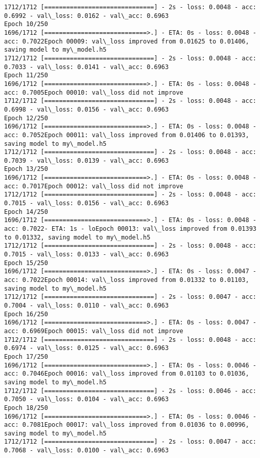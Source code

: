 \documentclass[11pt]{article}
\begin{document}
\begin{Verbatim}[commandchars=\\\{\}]
1712/1712 [==============================] - 2s - loss: 0.0048 - acc: 0.6992 - val\_loss: 0.0162 - val\_acc: 0.6963
Epoch 10/250
1696/1712 [============================>.] - ETA: 0s - loss: 0.0048 - acc: 0.7022Epoch 00009: val\_loss improved from 0.01625 to 0.01406, saving model to my\_model.h5
1712/1712 [==============================] - 2s - loss: 0.0048 - acc: 0.7033 - val\_loss: 0.0141 - val\_acc: 0.6963
Epoch 11/250
1696/1712 [============================>.] - ETA: 0s - loss: 0.0048 - acc: 0.7005Epoch 00010: val\_loss did not improve
1712/1712 [==============================] - 2s - loss: 0.0048 - acc: 0.6998 - val\_loss: 0.0156 - val\_acc: 0.6963
Epoch 12/250
1696/1712 [============================>.] - ETA: 0s - loss: 0.0048 - acc: 0.7052Epoch 00011: val\_loss improved from 0.01406 to 0.01393, saving model to my\_model.h5
1712/1712 [==============================] - 2s - loss: 0.0048 - acc: 0.7039 - val\_loss: 0.0139 - val\_acc: 0.6963
Epoch 13/250
1696/1712 [============================>.] - ETA: 0s - loss: 0.0048 - acc: 0.7017Epoch 00012: val\_loss did not improve
1712/1712 [==============================] - 2s - loss: 0.0048 - acc: 0.7015 - val\_loss: 0.0156 - val\_acc: 0.6963
Epoch 14/250
1696/1712 [============================>.] - ETA: 0s - loss: 0.0048 - acc: 0.7022- ETA: 1s - loEpoch 00013: val\_loss improved from 0.01393 to 0.01332, saving model to my\_model.h5
1712/1712 [==============================] - 2s - loss: 0.0048 - acc: 0.7015 - val\_loss: 0.0133 - val\_acc: 0.6963
Epoch 15/250
1696/1712 [============================>.] - ETA: 0s - loss: 0.0047 - acc: 0.7022Epoch 00014: val\_loss improved from 0.01332 to 0.01103, saving model to my\_model.h5
1712/1712 [==============================] - 2s - loss: 0.0047 - acc: 0.7004 - val\_loss: 0.0110 - val\_acc: 0.6963
Epoch 16/250
1696/1712 [============================>.] - ETA: 0s - loss: 0.0047 - acc: 0.6969Epoch 00015: val\_loss did not improve
1712/1712 [==============================] - 2s - loss: 0.0048 - acc: 0.6974 - val\_loss: 0.0125 - val\_acc: 0.6963
Epoch 17/250
1696/1712 [============================>.] - ETA: 0s - loss: 0.0046 - acc: 0.7046Epoch 00016: val\_loss improved from 0.01103 to 0.01036, saving model to my\_model.h5
1712/1712 [==============================] - 2s - loss: 0.0046 - acc: 0.7050 - val\_loss: 0.0104 - val\_acc: 0.6963
Epoch 18/250
1696/1712 [============================>.] - ETA: 0s - loss: 0.0046 - acc: 0.7081Epoch 00017: val\_loss improved from 0.01036 to 0.00996, saving model to my\_model.h5
1712/1712 [==============================] - 2s - loss: 0.0047 - acc: 0.7068 - val\_loss: 0.0100 - val\_acc: 0.6963

\end{Verbatim}
\end{document}
